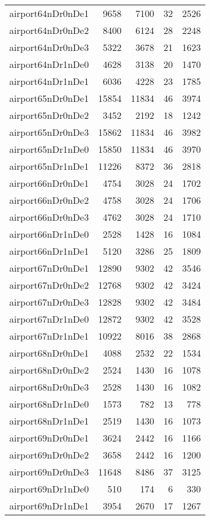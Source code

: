 \begin{longtable}{lrrrr}
airport64nDr0nDe1 & 9658 & 7100 & 32 & 2526 \\
airport64nDr0nDe2 & 8400 & 6124 & 28 & 2248 \\
airport64nDr0nDe3 & 5322 & 3678 & 21 & 1623 \\
airport64nDr1nDe0 & 4628 & 3138 & 20 & 1470 \\
airport64nDr1nDe1 & 6036 & 4228 & 23 & 1785 \\
airport65nDr0nDe1 & 15854 & 11834 & 46 & 3974 \\
airport65nDr0nDe2 & 3452 & 2192 & 18 & 1242 \\
airport65nDr0nDe3 & 15862 & 11834 & 46 & 3982 \\
airport65nDr1nDe0 & 15850 & 11834 & 46 & 3970 \\
airport65nDr1nDe1 & 11226 & 8372 & 36 & 2818 \\
airport66nDr0nDe1 & 4754 & 3028 & 24 & 1702 \\
airport66nDr0nDe2 & 4758 & 3028 & 24 & 1706 \\
airport66nDr0nDe3 & 4762 & 3028 & 24 & 1710 \\
airport66nDr1nDe0 & 2528 & 1428 & 16 & 1084 \\
airport66nDr1nDe1 & 5120 & 3286 & 25 & 1809 \\
airport67nDr0nDe1 & 12890 & 9302 & 42 & 3546 \\
airport67nDr0nDe2 & 12768 & 9302 & 42 & 3424 \\
airport67nDr0nDe3 & 12828 & 9302 & 42 & 3484 \\
airport67nDr1nDe0 & 12872 & 9302 & 42 & 3528 \\
airport67nDr1nDe1 & 10922 & 8016 & 38 & 2868 \\
airport68nDr0nDe1 & 4088 & 2532 & 22 & 1534 \\
airport68nDr0nDe2 & 2524 & 1430 & 16 & 1078 \\
airport68nDr0nDe3 & 2528 & 1430 & 16 & 1082 \\
airport68nDr1nDe0 & 1573 & 782 & 13 & 778 \\
airport68nDr1nDe1 & 2519 & 1430 & 16 & 1073 \\
airport69nDr0nDe1 & 3624 & 2442 & 16 & 1166 \\
airport69nDr0nDe2 & 3658 & 2442 & 16 & 1200 \\
airport69nDr0nDe3 & 11648 & 8486 & 37 & 3125 \\
airport69nDr1nDe0 & 510 & 174 & 6 & 330 \\
airport69nDr1nDe1 & 3954 & 2670 & 17 & 1267 \\

\end{longtable}
